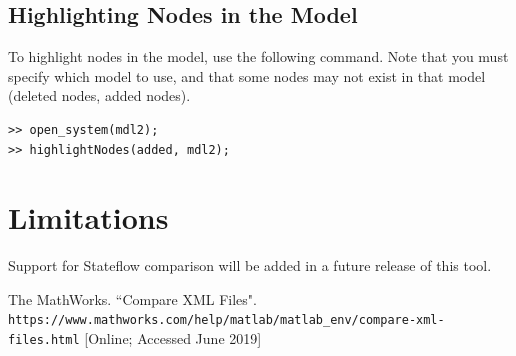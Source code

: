 \documentclass{article}
\begin{document}
\subsection{Highlighting Nodes in the Model}
To highlight nodes in the model, use the following command. Note that you must specify which model to use, and that some nodes may not exist in that model (\eg deleted nodes, added nodes).

\begin{lstlisting}
>> open_system(mdl2);
>> highlightNodes(added, mdl2);
\end{lstlisting}

\section{Limitations}
Support for Stateflow comparison will be added in a future release of this tool. 

\begin{thebibliography}{9}
The MathWorks. 
``Compare XML Files".
\\\texttt{https://www.mathworks.com/help/matlab/matlab\_env/compare-xml-files.html}
[Online; Accessed June 2019]
\end{thebibliography}
\end{document}
